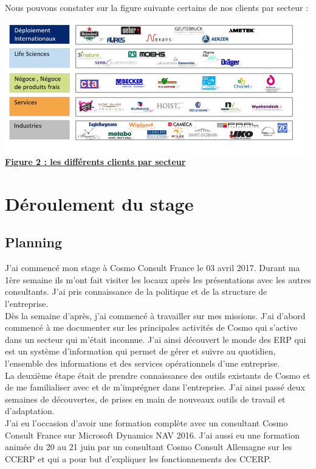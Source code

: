 \documentclass[11pt]{report}
\begin{document}
Nous pouvons constater sur la figure suivante certains de nos clients par secteur : 
\begin{center}
\includegraphics[scale=1]{images/figure2.png}
\underline{\textbf{Figure 2 : les différents clients par secteur}}
\end{center}

\section{Déroulement du stage}
	\subsection{Planning}
\hspace{1cm} J'ai commencé mon stage à Cosmo Consult France le 03 avril 2017.  Durant ma 1ère semaine ils m'ont fait visiter les locaux après les présentations avec les autres consultants. J’ai pris connaissance de la politique et de la structure de l’entreprise.\\

\hspace{1cm} Dès la semaine d’après, j’ai commencé à travailler sur mes missions. J’ai d’abord commencé à me documenter sur les principales activités de Cosmo qui s’active dans un secteur qui m’était inconnue. J’ai ainsi découvert le monde des ERP qui est un système d’information qui permet de gérer et suivre au quotidien, l’ensemble des informations et des services opérationnels d’une entreprise.\\

\hspace{1cm} La deuxième étape était de prendre connaissance des outils existants de Cosmo et de me familialiser avec et de m’imprégner dans l’entreprise. J’ai ainsi passé deux semaines de découvertes, de prises en main de nouveaux outils de travail et d’adaptation.\\

\hspace{1cm} J’ai eu l’occasion d’avoir une formation complète avec un consultant Cosmo Consult France sur Microsoft Dynamics NAV 2016.  J’ai aussi eu une formation animée du 20 au 21 juin par un consultant Cosmo Consult Allemagne sur les CCERP et qui a pour but d’expliquer les fonctionnements des CCERP.
\end{document}
